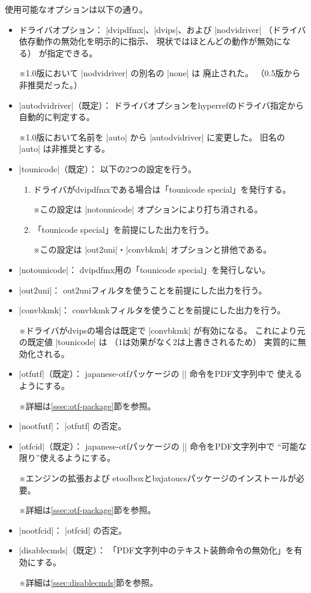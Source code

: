 \documentclass[uplatex,dvipdfmx,a4paper]{jsarticle}
\newcommand{\Pkg}[1]{\textsf{#1}}
\newcommand{\Note}{\par\noindent ※}
\newcommand{\Means}{：\quad}
\providecommand{\Strong}[1]{\textsf{#1}}
\begin{document}
使用可能なオプションは以下の通り。
\begin{itemize}
\item \Strong{ドライバオプション}\Means
  |dvipdfmx|、|dvips|、および |nodvidriver|%
  （ドライバ依存動作の無効化を明示的に指示、
  現状ではほとんどの動作が無効になる）
  が指定できる。
  \Note 1.0版において |nodvidriver| の別名の |none| は
    \Strong{廃止}された。
    （0.5版から非推奨だった。）
\item |autodvidriver|（既定）\Means
  ドライバオプションを\Pkg{hyperref}のドライバ指定から自動的に判定する。
  \Note 1.0版において名前を |auto| から |autodvidriver| に変更した。
    旧名の |auto| は\Strong{非推奨}とする。
\item |tounicode|（既定）\Means
  以下の2つの設定を行う。
  \begin{enumerate}
  \item ドライバがdvipdfmxである場合は「tounicode special」を発行する。
    \Note この設定は |notounicode| オプションにより打ち消される。
  \item 「tounicode special」を前提にした出力を行う。
    \Note この設定は |out2uni|・|convbkmk| オプションと排他である。
  \end{enumerate}
\item |notounicode|\Means
  dvipdfmx用の「tounicode special」を発行しない。
\item |out2uni|\Means
  out2uniフィルタを使うことを前提にした出力を行う。
\item |convbkmk|\Means
  convbkmkフィルタを使うことを前提にした出力を行う。
  \Note ドライバがdvipsの場合は既定で |convbkmk| が有効になる。
  これにより元の既定値 |tounicode| は
  （1は効果がなく2は上書きされるため）
  実質的に無効化される。
\item |otfutf|（既定）\Means
  \Pkg{japanese-otf}パッケージの |\UTF| 命令をPDF文字列中で
  使えるようにする。
  \Note 詳細は\ref{ssec:otf-package}節を参照。
\item |nootfutf|\Means
  |otfutf| の否定。
\item |otfcid|（既定）\Means
  \Pkg{japanese-otf}パッケージの |\CID| 命令をPDF文字列中で
  “可能な限り”使えるようにする。
  \Note エンジンの{\eTeX}拡張および
  \Pkg{etoolbox}と\Pkg{bxjatoucs}パッケージのインストールが必要。
  \Note 詳細は\ref{ssec:otf-package}節を参照。
\item |nootfcid|\Means
  |otfcid| の否定。
\item |disablecmds|（既定）\Means
  「PDF文字列中のテキスト装飾命令の無効化」を有効にする。
  \Note 詳細は\ref{ssec:disablecmds}節を参照。

\end{itemize}
\end{document}
